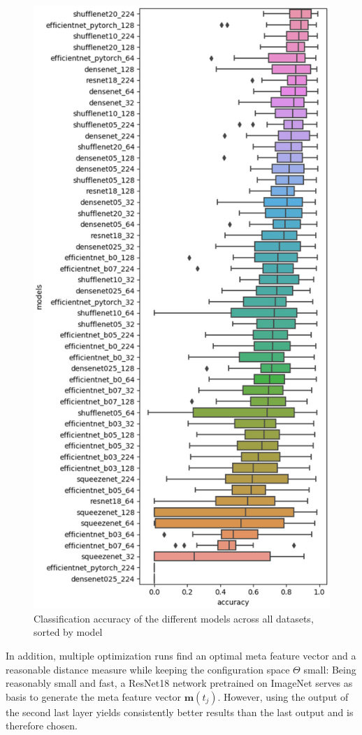 \documentclass{article}
\begin{document}
\begin{figure}[htb]
\begin{center}
 	\includegraphics[width=0.85\linewidth]{../figures/accuracy_results.eps} 
\end{center}
\caption{Classification accuracy of the different models across all datasets, sorted by model}
\label{fig:rank_results}
\end{figure} 

In addition, multiple optimization runs find an optimal meta feature vector and a reasonable distance measure while keeping the configuration space $\Theta$ small: Being reasonably small and fast, a ResNet18 network pretrained on ImageNet serves as basis to generate the meta feature vector $\mathbf{m}(t_j)$. However, using the output of the second last layer yields consistently better results than the last output and is therefore chosen.
\end{document}
